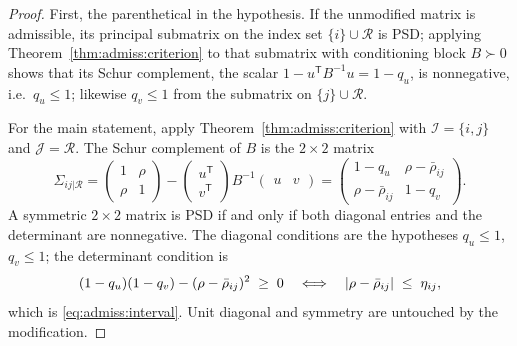 \begin{proof}
First, the parenthetical in the hypothesis. If the unmodified matrix is
admissible, its principal submatrix on the index set $\{i\} \cup \mathcal{R}$
is PSD; applying Theorem~\ref{thm:admiss:criterion} to that submatrix with
conditioning block $B \succ 0$ shows that its Schur complement, the scalar
$1 - u^{\mathsf T} B^{-1} u = 1 - q_u$, is nonnegative, i.e.\ $q_u \le 1$;
likewise $q_v \le 1$ from the submatrix on $\{j\} \cup \mathcal{R}$.

For the main statement, apply Theorem~\ref{thm:admiss:criterion} with
$\mathcal I = \{i, j\}$ and $\mathcal J = \mathcal{R}$. The Schur complement
of $B$ is the $2 \times 2$ matrix
\[
  \Sigma_{ij|\mathcal{R}}
  = \begin{pmatrix} 1 & \rho \\ \rho & 1 \end{pmatrix}
    - \begin{pmatrix} u^{\mathsf T} \\ v^{\mathsf T} \end{pmatrix}
      B^{-1} \begin{pmatrix} u & v \end{pmatrix}
  = \begin{pmatrix}
      1 - q_u & \rho - \bar\rho_{ij} \\
      \rho - \bar\rho_{ij} & 1 - q_v
    \end{pmatrix}.
\]
A symmetric $2 \times 2$ matrix is PSD if and only if both diagonal entries
and the determinant are nonnegative. The diagonal conditions are the
hypotheses $q_u \le 1$, $q_v \le 1$; the determinant condition is
\[
  (1 - q_u)(1 - q_v) - (\rho - \bar\rho_{ij})^2 \;\ge\; 0
  \quad\Longleftrightarrow\quad
  \lvert\rho - \bar\rho_{ij}\rvert \;\le\; \eta_{ij},
\]
which is \eqref{eq:admiss:interval}. Unit diagonal and symmetry are
untouched by the modification.
\end{proof}

